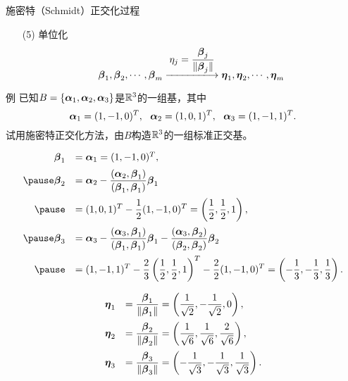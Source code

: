 \begin{frame}
  \begin{footnotesize}
    \begin{block}{施密特（Schmidt）正交化过程}
      \begin{itemize}
      \item[(5)] 单位化
        $$
        \betabd_1, \betabd_2, \cd, \betabd_m \xlongrightarrow[]{\ds \eta_j=\frac{\betabd_j}{\|\betabd_j\|}}
        \etabd_1, \etabd_2, \cd, \etabd_m
        $$
      \end{itemize}
    \end{block}
  \end{footnotesize}
\end{frame}


\begin{frame}
  \begin{footnotesize}
    \begin{exampleblock}{例}
      已知$B=\{\boldsymbol{\alpha}_1,\boldsymbol{\alpha}_2,\boldsymbol{\alpha}_3\}$是$\mathbb{R}^3$的一组基，其中
      $$
      \boldsymbol{\alpha}_1=(1,-1,0)^T,~~
      \boldsymbol{\alpha}_2=(1,0,1)^T,~~
      \boldsymbol{\alpha}_3=(1,-1,1)^T.
      $$
      试用施密特正交化方法，由$B$构造$\mathbb{R}^3$的一组标准正交基。
    \end{exampleblock}
    \pause\jiename
    $$
    \begin{array}{rl}
      \betabd_1&=\alphabd_1=(1,-1,0)^T, \\[0.2cm]\pause
      \betabd_2&\ds=\alphabd_2-\frac{(\alphabd_2,\betabd_1)}{(\betabd_1,\betabd_1)}\betabd_1\\[0.4cm]\pause
      &\ds=(1,0,1)^T-\frac12(1,-1,0)^T=\left(\frac12,\frac12,1\right),\\[0.4cm]\pause
      \betabd_3&\ds=\alphabd_3-\frac{(\alphabd_3,\betabd_1)}{(\betabd_1,\betabd_1)}\betabd_1
      -\frac{(\alphabd_3,\betabd_2)}{(\betabd_2,\betabd_2)}\betabd_2\\[0.4cm]\pause
      &\ds=(1,-1,1)^T-\frac23\left(\frac12,\frac12,1\right)^T-\frac22(1,-1,0)^T=\left(-\frac13,-\frac13,\frac13\right).
    \end{array}
    $$
  \end{footnotesize}
\end{frame}


\begin{frame}
  \begin{footnotesize}
    $$
    \begin{array}{rl}
      \boldsymbol{\eta}_1&\displaystyle =\frac{\boldsymbol{\beta}_1}{\|\boldsymbol{\beta}_1\|}=\left(\frac1{\sqrt{2}},-\frac1{\sqrt{2}},0\right),\\[0.4cm]
      \boldsymbol{\eta}_2&\displaystyle =\frac{\boldsymbol{\beta}_2}{\|\boldsymbol{\beta}_2\|}=\left(\frac1{\sqrt{6}},\frac1{\sqrt{6}},\frac2{\sqrt{6}}\right),\\[0.4cm]
      \boldsymbol{\eta}_3&\displaystyle =\frac{\boldsymbol{\beta}_3}{\|\boldsymbol{\beta}_3\|}=\left(-\frac1{\sqrt{3}},-\frac1{\sqrt{3}},\frac1{\sqrt{3}}\right).
    \end{array}
    $$
  \end{footnotesize}
\end{frame}



